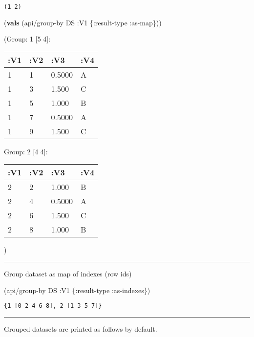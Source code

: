 \documentclass[]{article}
\newenvironment{Shaded}{\begin{snugshade}}{\end{snugshade}}
\newcommand{\KeywordTok}[1]{\textcolor[rgb]{0.13,0.29,0.53}{\textbf{#1}}}
\newcommand{\AttributeTok}[1]{\textcolor[rgb]{0.77,0.63,0.00}{#1}}
\newcommand{\NormalTok}[1]{#1}
\begin{document}
\begin{verbatim}
(1 2)
\end{verbatim}

\begin{Shaded}
\begin{Highlighting}[]
\NormalTok{(}\KeywordTok{vals}\NormalTok{ (api/group-by DS }\AttributeTok{:V1}\NormalTok{ \{}\AttributeTok{:result-type} \AttributeTok{:as-map}\NormalTok{\}))}
\end{Highlighting}
\end{Shaded}

(Group: 1 {[}5 4{]}:

\begin{longtable}[]{@{}llll@{}}
\toprule
:V1 & :V2 & :V3 & :V4\tabularnewline
\midrule
\endhead
1 & 1 & 0.5000 & A\tabularnewline
1 & 3 & 1.500 & C\tabularnewline
1 & 5 & 1.000 & B\tabularnewline
1 & 7 & 0.5000 & A\tabularnewline
1 & 9 & 1.500 & C\tabularnewline
\bottomrule
\end{longtable}

Group: 2 {[}4 4{]}:

\begin{longtable}[]{@{}llll@{}}
\toprule
:V1 & :V2 & :V3 & :V4\tabularnewline
\midrule
\endhead
2 & 2 & 1.000 & B\tabularnewline
2 & 4 & 0.5000 & A\tabularnewline
2 & 6 & 1.500 & C\tabularnewline
2 & 8 & 1.000 & B\tabularnewline
\bottomrule
\end{longtable}

)

\begin{center}\rule{0.5\linewidth}{0.5pt}\end{center}

Group dataset as map of indexes (row ids)

\begin{Shaded}
\begin{Highlighting}[]
\NormalTok{(api/group-by DS }\AttributeTok{:V1}\NormalTok{ \{}\AttributeTok{:result-type} \AttributeTok{:as-indexes}\NormalTok{\})}
\end{Highlighting}
\end{Shaded}

\begin{verbatim}
{1 [0 2 4 6 8], 2 [1 3 5 7]}
\end{verbatim}

\begin{center}\rule{0.5\linewidth}{0.5pt}\end{center}

Grouped datasets are printed as follows by default.
\end{document}
